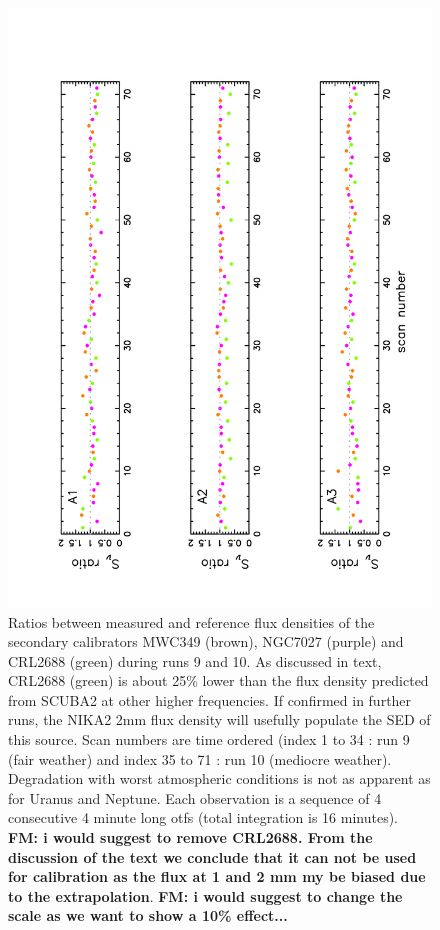 \begin{figure}[p]
\begin{center}
  \includegraphics[clip, angle=-90, scale=0.6]{Figures/Ratio_vs_index_sec_r9_r10.pdf}
  \caption{Ratios between measured and reference flux densities of  the secondary calibrators  MWC349 (brown), NGC7027 (purple)  and CRL2688 (green)
  during runs 9 and 10. As discussed in text, CRL2688 (green) is about 25\% lower than the flux density predicted from SCUBA2 at other higher frequencies.
  If confirmed in further runs, the NIKA2 2mm flux density will usefully populate the SED of this source.  
    Scan numbers are time ordered (index 1 to 34 : run 9 (fair weather) and index 35 to 71 : run 10 (mediocre weather).
    Degradation with worst atmospheric conditions is not as apparent as for Uranus and Neptune.
    Each observation is a sequence of 4 consecutive 4 minute long otfs (total integration is 16 minutes).
    {\bf FM: i would suggest to remove CRL2688. From the discussion of the text we conclude that it can not be used for calibration as the
    flux at 1 and 2 mm my be biased due to the extrapolation}. 
    {\bf FM: i would suggest to change the scale as we want to show a 10\% effect...}}
\label{fig:ratio_cal_sec}
\end{center}
\end{figure}


